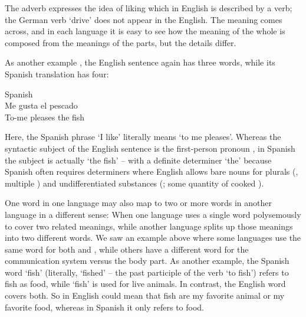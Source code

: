 The adverb  expresses the idea of liking which in English is described by a verb; the German verb  `drive' does not appear in the English.  The meaning comes across, and in each language it is easy to see how the meaning of the whole is composed from the meanings of the parts, but the details differ. 

As another example , the English sentence  again has three words,  while its Spanish translation has four:


\ea \label{pescado} Spanish \\
\gll Me gusta el pescado \\
To-me pleases the fish \\
\z 


Here, the Spanish phrase  `I like' literally means `to me pleases'.  Whereas the syntactic subject of the English sentence is the first-person pronoun , in Spanish the subject is actually  `the fish' -- with a definite determiner   `the' because Spanish often requires determiners where English allows bare nouns for plurals (, multiple ) and undifferentiated substances (; some quantity of cooked ).  


One word in one language may also map to two or more words in another language in a different sense: When one language uses a single word polysemously to cover two related meanings, while another language splits up those meanings into two different words.  We saw an example above where some languages use the same word for both  and , while others have a different word for the communication system versus the body part.  As another example, the Spanish word  `fish' (literally, `fished' -- the past participle of the verb  `to fish') refers to fish as food, while  `fish' is used for live animals.  In contrast, the English word  covers both.  So  in English could mean that fish are my favorite animal or my favorite food, whereas in Spanish it only refers to food.

  

